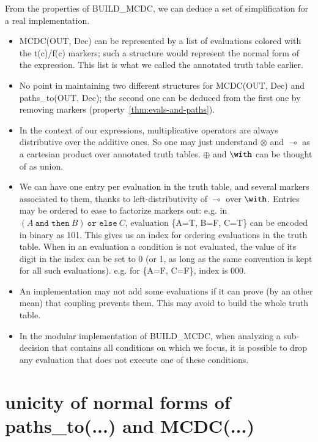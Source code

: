 \documentclass[a4paper,12pt,twoside]{article}
\newcommand{\andthen}{\texttt{and then}}
\newcommand{\orelse}{\texttt{or else}}
\begin{document}
From the properties of BUILD\_MCDC, we can deduce a set of
simplification for a real implementation.

\begin{itemize}
\item MCDC(OUT, Dec) can be represented by a list of evaluations
colored with the t(c)/f(c) markers; such a structure would represent
the normal form of the expression. This list is what we called the
annotated truth table earlier.

\item No point in maintaining two different structures for MCDC(OUT, Dec) and
paths\_to(OUT, Dec); the second one can be deduced from the first one by
removing markers (property~\ref{thm:evals-and-paths}).

\item In the context of our expressions, multiplicative operators are
always distributive over the additive ones. So one may just understand
$\otimes$ and $\multimap$ as a cartesian product over annotated truth tables.
$\oplus$ and $\with$ can be thought of as union.

\item We can have one entry per evaluation in the truth table, and several
markers associated to them, thanks to left-distributivity of $\multimap$ over
$\with$. Entries may be ordered to ease to factorize markers out:
e.g. in $(A \ \andthen{} \ B) \ \orelse{} \ C$, evaluation \{A=T, B=F, C=T\}
can be encoded in binary as 101. This gives us an index for ordering
evaluations in the truth table. When in an evaluation a condition is
not evaluated, the value of its digit in the index can be set to
0 (or 1, as long as the same convention is kept for all such evaluations).
e.g. for \{A=F, C=F\}, index is 000.

\item An implementation may not add some evaluations if it can prove (by
an other mean) that coupling prevents them. This may avoid to build
the whole truth table.

\item In the modular implementation of BUILD\_MCDC, when analyzing a
sub-decision that contains all conditions on which we focus, it is
possible to drop any evaluation that does not execute one of these
conditions.
\end{itemize}

\appendix
\section{unicity of normal forms of paths\_to(...) and MCDC(...)}
\label{ap:proof-truth-table-unicity}
\end{document}
